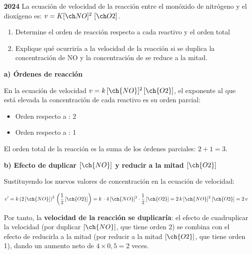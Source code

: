 \begin{exerciseEVAU}
    \textbf{2024} La ecuación de velocidad de la reacción entre el monóxido de nitrógeno y el
    dioxígeno es: \( v = K\conc{NO}^2\ \conc{O2} \).
    \begin{enumerate}[label=\letraminuscula]
        \item Determine el orden de reacción respecto a cada reactivo y el orden total
        \item Explique qué ocurriría a la velocidad de la reacción si se duplica la concentración de NO
        y la concentración de  se reduce a la mitad.
    \end{enumerate}

    \begin{solu}

        \textbf{a) Órdenes de reacción}

        En la ecuación de velocidad \(v = k\, [\ch{NO}]^2\, [\ch{O2}]\), el exponente al que está elevada la concentración de cada reactivo es su orden parcial:

        \begin{itemize}
            \item Orden respecto a : 2
            \item Orden respecto a : 1
        \end{itemize}

        El orden total de la reacción es la suma de los órdenes parciales: \(2 + 1 = 3\).

        \textbf{b) Efecto de duplicar \([\ch{NO}]\) y reducir a la mitad \([\ch{O2}]\)}

        Sustituyendo los nuevos valores de concentración en la ecuación de velocidad:

        \begin{equation*}
            v' = k\, (2\, [\ch{NO}])^2\, \left( \dfrac{1}{2}\, [\ch{O2}] \right) = k\, \cdot 4\, [\ch{NO}]^2 \cdot \dfrac{1}{2}\, [\ch{O2}] = 2\, k\, [\ch{NO}]^2\, [\ch{O2}] = 2\, v
        \end{equation*}

        Por tanto, la \textbf{velocidad de la reacción se duplicaría}: el efecto de cuadruplicar la velocidad (por duplicar \([\ch{NO}]\), que tiene orden 2) se combina con el efecto de reducirla a la mitad (por reducir a la mitad \([\ch{O2}]\), que tiene orden 1), dando un aumento neto de \(4 \times 0,5 = 2\) veces.

    \end{solu}
\end{exerciseEVAU}


